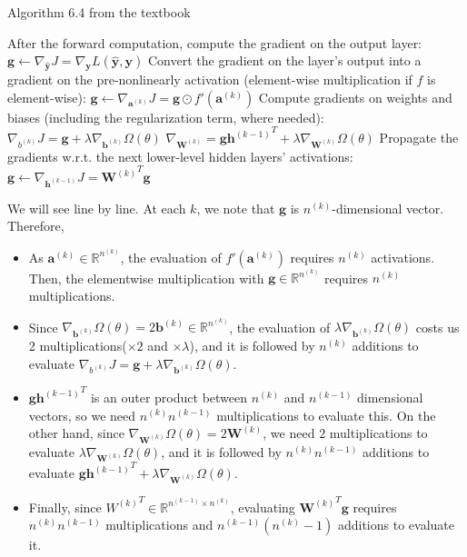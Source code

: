 \documentclass[
	12pt, %
]{../Template/fphw}
\renewcommand{\b}{\mathbf{b}}
\newcommand{\y}{\mathbf{y}}
\newcommand{\h}{\mathbf{h}}
\renewcommand{\a}{\mathbf{a}}
\newcommand{\W}{\mathbf{W}}
\newcommand{\g}{\mathbf{g}}
\begin{document}
\begin{enumerate}[label=(\arabic*)]
\begin{algorithm}
    \caption{Algorithm 6.4 from the textbook}\label{alg:6.4}
    \begin{algorithmic}
        \State After the forward computation, compute the gradient on the output layer:
        \State $\g \leftarrow \nabla_{\hat{\y}} J = \nabla_{\y}L(\hat{\y},\y)$
        \State Convert the gradient on the layer's output into a gradient on the pre-nonlinearly activation (element-wise multiplication if $f$ is element-wise):
        \State $\g \leftarrow \nabla_{\a^{(k)}}J = \g\odot f'(\a^{(k)})$
        \State Compute gradients on weights and biases (including the regularization term, where needed):
        \State $\nabla_{b^{(k)}} J = \g + \lambda \nabla_{\b^{(k)}} \Omega (\theta)$ 
        \State $\nabla_{\W^{(k)}} = \g {\h^{(k-1)}}^T + \lambda \nabla_{\W^{(k)}}\Omega (\theta)$
        \State Propagate the gradients w.r.t. the next lower-level hidden layers' activations:
        \State $\g\leftarrow \nabla_{\h^{(k-1)}}J = {\W^{(k)}}^{T} \g$
        \EndFor
    \end{algorithmic}
\end{algorithm}
 We will see line by line. At each $k$, we note that $\g$ is $n^{(k)}$-dimensional vector. Therefore,
\begin{itemize}
    \item As $\a^{(k)}\in \mathbb{R}^{n^{(k)}}$, the evaluation of $f'(\a^{(k)})$ requires $n^{(k)}$ activations. Then, the elementwise multiplication with $\g \in \mathbb{R}^{n^{(k)}}$ requires $n^{(k)}$ multiplications. 
    \item Since $\nabla_{\b^{(k)}}\Omega (\theta) = 2\b^{(k)}\in \mathbb{R}^{n^{(k)}}$, the evaluation of $\lambda \nabla_{\b^{(k)}} \Omega (\theta)$ costs us 2 multiplications($\times 2$ and $\times \lambda$), and it is followed by $n^{(k)}$ additions to evaluate $\nabla_{b^{(k)}} J = \g + \lambda \nabla_{\b^{(k)}} \Omega (\theta)$.
    \item $\g {\h^{(k-1)}}^T$ is an outer product between $n^{(k)}$ and $n^{(k-1)}$ dimensional vectors, so we need $n^{(k)}n^{(k-1)}$ multiplications to evaluate this. On the other hand, since $\nabla_{\W^{(k)}}\Omega (\theta) = 2 \W^{(k)}$, we need $2$ multiplications to evaluate $\lambda \nabla_{\W^{(k)}}\Omega (\theta)$, and it is followed by $n^{(k)}n^{(k-1)}$ additions to evaluate $\g {\h^{(k-1)}}^T + \lambda \nabla_{\W^{(k)}}\Omega (\theta)$.
    \item Finally, since ${W^{(k)}}^T\in \mathbb{R}^{n^{(k-1)}\times n^{(k)}}$, evaluating ${\W^{(k)}}^{T} \g$ requires $n^{(k)}n^{(k-1)}$ multiplications and $n^{(k-1)}(n^{(k)}-1)$ additions to evaluate it.

\end{itemize}
\end{enumerate}
\end{document}
